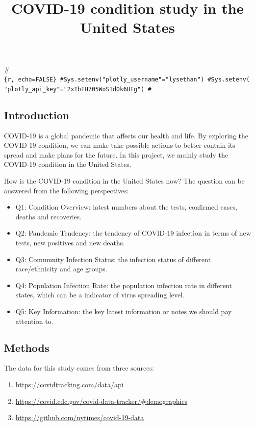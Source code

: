 \documentclass[
]{article}
\title{COVID-19 condition study in the United States}
\author{}
\date{\vspace{-2.5em}}
\providecommand{\tightlist}{%
  \setlength{\itemsep}{0pt}\setlength{\parskip}{0pt}}
\begin{document}
\maketitle

{
\setcounter{tocdepth}{3}
\tableofcontents
}
\#\texttt{\{r,\ echo=FALSE\}\ \#Sys.setenv("plotly\_username"="lysethan")\ \#Sys.setenv("plotly\_api\_key"="2xTbFH705WoS1d0k6UEg")\ \#}

\hypertarget{introduction}{%
\subsection{Introduction}\label{introduction}}

COVID-19 is a global pandemic that affects our health and life. By
exploring the COVID-19 condition, we can make take possible actions to
better contain its spread and make plans for the future. In this
project, we mainly study the COVID-19 condition in the United States.

How is the COVID-19 condition in the United States now? The question can
be answered from the following perspectives:

\begin{itemize}
\tightlist
\item
  Q1: Condition Overview: latest numbers about the tests, confirmed
  cases, deaths and recoveries.
\item
  Q2: Pandemic Tendency: the tendency of COVID-19 infection in terms of
  new tests, new positives and new deaths.
\item
  Q3: Community Infection Status: the infection status of different
  race/ethnicity and age groups.
\item
  Q4: Population Infection Rate: the population infection rate in
  different states, which can be a indicator of virus spreading level.
\item
  Q5: Key Information: the key latest information or notes we should pay
  attention to.
\end{itemize}

\hypertarget{methods}{%
\subsection{Methods}\label{methods}}

The data for this study comes from three sources:

\begin{enumerate}
\def\labelenumi{\arabic{enumi}.}
\tightlist
\item
  \url{https://covidtracking.com/data/api}
\item
  \url{https://covid.cdc.gov/covid-data-tracker/\#demographics}
\item
  \url{https://github.com/nytimes/covid-19-data}
\end{enumerate}
\end{document}
